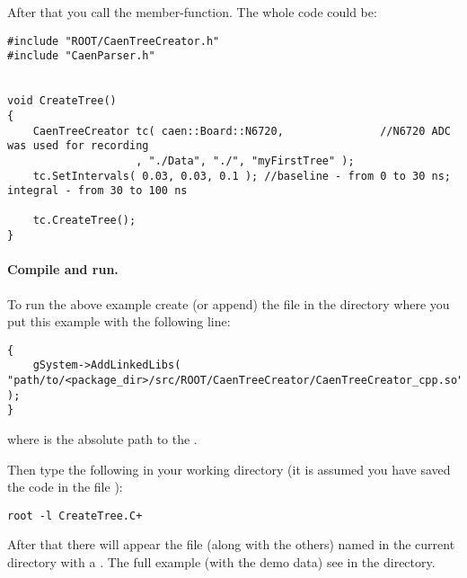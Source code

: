 
After that you call the  member-function. The whole code could be:

\begin{lstlisting}
#include "ROOT/CaenTreeCreator.h"
#include "CaenParser.h"


void CreateTree()
{
    CaenTreeCreator tc( caen::Board::N6720,               //N6720 ADC was used for recording
                    , "./Data", "./", "myFirstTree" );
    tc.SetIntervals( 0.03, 0.03, 0.1 ); //baseline - from 0 to 30 ns; integral - from 30 to 100 ns 

    tc.CreateTree();
}
\end{lstlisting}

\paragraph*{Compile and run.} To run the above example create (or append) the  file in the directory
where you put this example with the following line:
\begin{lstlisting}
{
    gSystem->AddLinkedLibs( "path/to/<package_dir>/src/ROOT/CaenTreeCreator/CaenTreeCreator_cpp.so" );
}
\end{lstlisting}
where  is the absolute path to the .

Then type the following in your working directory (it is assumed you have saved the code in the file ):
\begin{lstlisting}
root -l CreateTree.C+
\end{lstlisting}
After that there will appear the file (along with the others) named  in the current directory with a . The full example (with the demo data)
see in the  directory.
